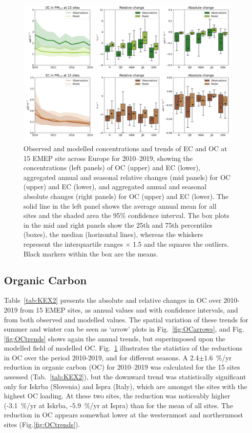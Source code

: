 \begin{figure}[t]
\includegraphics[width=16cm]{FIGS_TRENDS/ECOC_trends.png}
\caption{Observed and modelled concentrations and trends of EC and OC at 15 EMEP
  site across Europe for 2010--2019, showing the concentrations
  (left panels) of OC (upper) and EC (lower), aggregated annual and
  seasonal relative changes (mid panels) for OC (upper) and EC (lower),
  and aggregated annual and seasonal absolute changes (right panels)
  for OC (upper) and EC (lower). The solid line in the left panel shows
  the average annual mean for all sites and the shaded area the 95\%
  confidence interval. The box plots in the mid and right panels show
  the 25th and 75th percentiles (boxes), the median (horizontal lines),
  whereas the whiskers represent the interquartile ranges $\times$
  1.5 and the squares the outliers. Black markers within the box are
  the means.\label{fig:KEX1}
}
\end{figure}







\subsection{Organic Carbon}
\label{ss:trendsOC}
 
 Table~\ref{tab:KEX2} presents the absolute and relative changes in OC over 2010-2019 from 15 EMEP sites, as annual values and with confidence intervals, and from both observed and modelled values. The spatial variation of these trends for summer and winter can be seen as `arrow' plots in Fig.~\ref{fig:OCarrows}, and Fig.\ref{fig:OCtrends} shows again the annual trends, but superimposed upon the modelled field of modelled OC.
Fig.~\ref{fig:KEX1} illustrates the statistics of the reductions in OC  over the period 2010-2019, and for different seasons. 
A 2.4$\pm$1.6~\%/yr reduction
  in organic carbon (OC) for 2010--2019
was calculated for the 15 sites assessed (Tab.~\ref{tab:KEX2}), but the
downward trend was statistically significant only for Iskrba (Slovenia)
and Ispra (Italy), which are amongst the sites with the highest OC
loading. At these two sites, the reduction was noticeably higher 
(-3.1~\%/yr at Iskrba, -5.9~\%/yr at Ispra) than for the mean of all sites. The
reduction in OC appears somewhat lower at the westernmost and northernmost
sites (Fig.\ref{fig:OCtrends}). 


